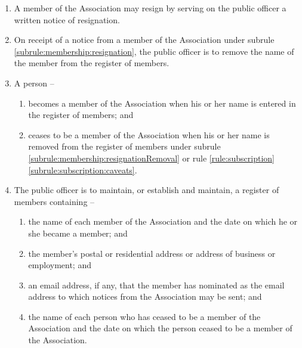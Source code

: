 \begin{enumerate}
	\item \label{subrule:membership:resignation} A member of the Association may resign by serving on the public officer a written notice of resignation.
	\item \label{subrule:membership:resignationRemoval} On receipt of a notice from a member of the Association under subrule \ref{subrule:membership:resignation}, the public officer is to remove the name of the member from the register of members.

	\item A person --
	\begin{enumerate}
		\item becomes a member of the Association when his or her name is entered in the register of members; and
		\item ceases to be a member of the Association when his or her name is removed from the register of members under subrule \ref{subrule:membership:resignationRemoval} or rule \ref{rule:subscription}\ref{subrule:subscription:caveats}.
	\end{enumerate}
	
	\item \label{subrule:membership:registry} The public officer is to maintain, or establish and maintain, a register of members containing --
	\begin{enumerate}
		\item the name of each member of the Association and the date on which he or she became a member; and
		\item the member's postal or residential address or address of business or employment; and
		\item an email address, if any, that the member has nominated as the email address to which notices from the Association may be sent; and
		\item the name of each person who has ceased to be a member of the Association and the date on which the person ceased to be a member of the Association.
	\end{enumerate}
	
\end{enumerate}